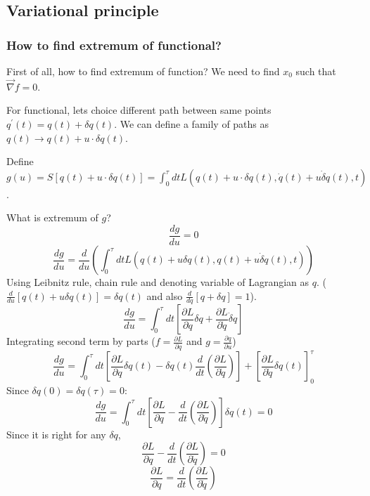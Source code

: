 \subsection{Variational principle}
\subsubsection{How to find extremum of functional?}
First of all, how to find extremum of function? We need to find $x_0$ such that $\vec{\nabla} f = 0$.

For functional, lets choice different path between same points $q^\prime(t) = q(t) + \delta q(t)$. We can define a family of paths as $q(t) \to q(t)+u\cdot \delta q(t)$.

Define $g(u) = S\left[ q(t) + u \cdot \delta q(t) \right] = \int_0^\tau dt L(q(t) + u\cdot  \delta q(t), \dot{q}(t) + u\dot{\delta} q(t), t)$.

What is extremum of $g$?
$$\frac{dg}{du} = 0$$
$$\frac{dg}{du} = \frac{d}{du} \left( \int_0^\tau dt L(q(t) + u\delta q(t), q(t) + u\dot{\delta} q(t), t) \right) $$
Using Leibnitz rule, chain rule and denoting variable of Lagrangian as $q$. ($\frac{d}{du}\left[ q(t) + u\delta q(t)\right] = \delta q(t)  $ and also $\frac{d}{dq} \left[ q+\delta q \right] = 1$).
$$\frac{dg}{du} = \int_0^\tau dt \left[ \frac{\partial L}{\partial q} \delta q + \frac{\partial L}{\partial \dot{q}} \dot{\delta} q \right] $$
Integrating second term by parts ($f= \frac{\partial L}{\partial q}$ and $g = \frac{\partial q}{\partial u}$)
$$\frac{dg}{du} = \int_0^\tau dt \left[  \frac{\partial L}{\partial q} \delta q(t) - \delta q(t) \frac{d}{dt} \left(  \frac{\partial L}{\partial \dot{q}}  \right) \right] + \left[\frac{\partial L}{\partial \dot{q}} \delta q(t) \right]_0^\tau$$
Since $\delta q (0) = \delta q (\tau) = 0$:
$$\frac{dg}{du} = \int_0^\tau dt \left[ \frac{\partial L}{\partial q} - \frac{d}{dt} \left(  \frac{\partial L}{\partial \dot{q}}  \right) \right] \delta q(t) = 0$$
Since it is right for any $\delta q$,
$$\frac{\partial L}{\partial q} - \frac{d}{dt} \left(  \frac{\partial L}{\partial \dot{q}}\right) = 0$$
$$\frac{\partial L}{\partial q} = \frac{d}{dt} \left(  \frac{\partial L}{\partial \dot{q}}\right) $$